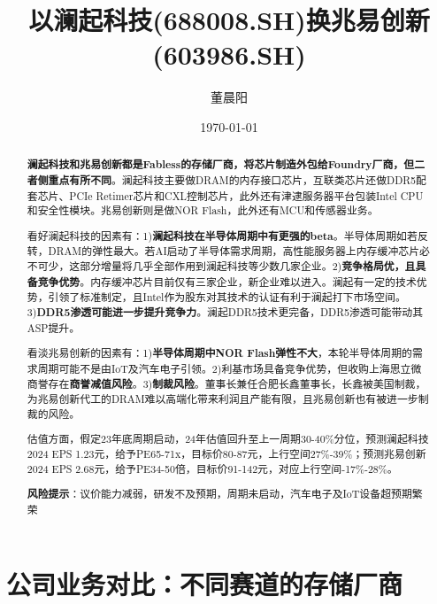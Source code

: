 \documentclass[a4paper,12pt]{ctexart}
\title{以澜起科技(688008.SH)换兆易创新(603986.SH)}
\author{董晨阳}
\date{\today}
\begin{document}
\maketitle
\thispagestyle{empty}
\begin{abstract}
    \textbf{澜起科技和兆易创新都是Fabless的存储厂商，将芯片制造外包给Foundry厂商，但二者侧重点有所不同}。澜起科技主要做DRAM的内存接口芯片，互联类芯片还做DDR5配套芯片、PCIe Retimer芯片和CXL控制芯片，此外还有津逮服务器平台包装Intel CPU和安全性模块。兆易创新则是做NOR Flash，此外还有MCU和传感器业务。

    看好澜起科技的因素有：1)\textbf{澜起科技在半导体周期中有更强的beta}。半导体周期如若反转，DRAM的弹性最大。若AI启动了半导体需求周期，高性能服务器上内存缓冲芯片必不可少，这部分增量将几乎全部作用到澜起科技等少数几家企业。2)\textbf{竞争格局优，且具备竞争优势}。内存缓冲芯片目前仅有三家企业，新企业难以进入。澜起有一定的技术优势，引领了标准制定，且Intel作为股东对其技术的认证有利于澜起打下市场空间。3)\textbf{DDR5渗透可能进一步提升竞争力}。澜起DDR5技术更完备，DDR5渗透可能带动其ASP提升。

    看淡兆易创新的因素有：1)\textbf{半导体周期中NOR Flash弹性不大}，本轮半导体周期的需求周期可能不是由IoT及汽车电子引领。2)利基市场具备竞争优势，但收购上海思立微商誉存在\textbf{商誉减值风险}。3)\textbf{制裁风险}。董事长兼任合肥长鑫董事长，长鑫被美国制裁，为兆易创新代工的DRAM难以高端化带来利润且产能有限，且兆易创新也有被进一步制裁的风险。

    估值方面，假定23年底周期启动，24年估值回升至上一周期30-40\%分位，预测澜起科技2024 EPS 1.23元，给予PE65-71x，目标价80-87元，上行空间27\%-39\%；预测兆易创新2024 EPS 2.68元，给予PE34-50倍，目标价91-142元，对应上行空间-17\%-28\%。

    \textbf{风险提示}：议价能力减弱，研发不及预期，周期未启动，汽车电子及IoT设备超预期繁荣
\end{abstract}
\clearpage
\tableofcontents
\listoffigures
\clearpage
\setcounter{page}{1}
\section{公司业务对比：不同赛道的存储厂商}
\end{document}

